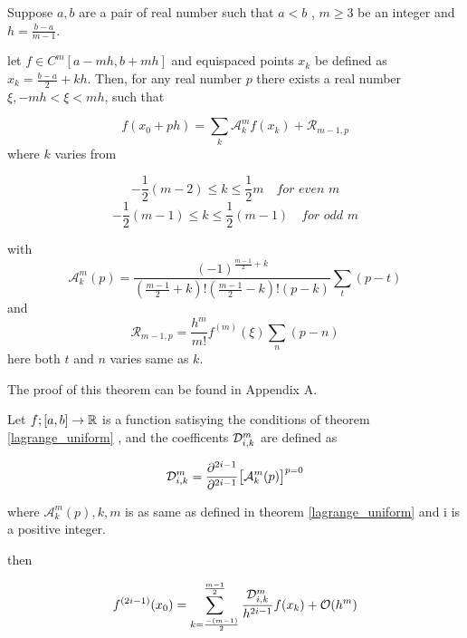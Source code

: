 \documentclass[../document.tex]{subfiles}
\begin{document}
	\begin{theorem} \label{lagrange_uniform}
		
		Suppose $a,b$ are a pair of real number such that $a<b$ , $m \ge 3$ be an integer and $h = \frac{b-a}{m-1}$. 
		
		let $f \in C^{m}[a-mh,b+mh]$ and equispaced points $x_k$ be defined as  $x_k  = \frac{b-a}{2} +kh$.
		Then, for any real number $p$ there exists a real number 
		$\xi , -mh <\xi<mh $, such that
		
		\begin{equation} \label{l11}
			f(x_0 + ph) = \sum_{k} \mathcal{A}_{k}^{m} f(x_k) + \mathcal{R}_{m-1,p}
		\end{equation}
		where $k$ varies from
		
		
		
		$$
		-\frac{1}{2}(m-2) \leq k \leq \frac{1}{2}m  \quad 
		\textit{for even m}
		$$
		$$
		-\frac{1}{2}(m-1) \leq k \leq \frac{1}{2}(m-1)  \quad 
		\textit{for odd m}
		$$
		
		with
		$$
		\mathcal{A}_{k}^{m}(p) = 
		\frac{ (-1)^{\frac{m-1}{2}+k} }{
			(\frac{m-1}{2} + k)!
			(\frac{m-1}{2} - k)!
			(p-k)}
		\sum_{t}(p-t)
		$$
		and
		$$
		\mathcal{R}_{m-1,p} = \frac{ h^{m} }{m!} f^{(m)}(\xi)
		\sum_{n} (p-n)
		$$
		here both $t$ and $n$ varies same as $k$. 
	\end{theorem}
	The proof of this theorem can be found in Appendix A.
	
	
	
	\begin{lemma}
		Let $f;[a,b] \rightarrow \mathbb{R}$  is a function satisying the conditions of 
		theorem \ref{lagrange_uniform} , and the coefficents $\mathcal{D}_{i,k}^{m}$ are defined as
		
		\begin{equation*}  \label{3coff_initial}
			\mathcal{D}_{i,k}^{m} = 
			\frac{\partial^{2i-1}}{\partial^{2i-1} } \big[
			\mathcal{A}_{k}^{m} (p)
			\big]^{p=0}
		\end{equation*}
		
		where $\mathcal{A}_{k}^{m} (p) ,k,m$ is as same as defined in 
		theorem  \ref{lagrange_uniform} and i is a positive integer.
		
		then
		
		\begin{equation} \label{20}
			f^{(2i-1)} (x_0) = 
			\sum_{k = \frac{-(m-1)}{2} }^{\frac{m-1}{2} } 
			\frac{	\mathcal{D}_{i,k}^{m}   }{	h^{2i-1}	}
			f(x_k) + \mathcal{O}(h^m)
		\end{equation}
	\end{lemma}
	
\end{document}
